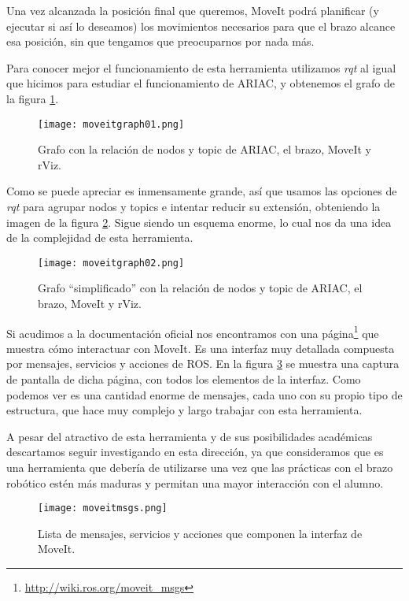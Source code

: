 Una vez alcanzada la posición final que queremos, MoveIt podrá planificar (y ejecutar si así lo deseamos) los movimientos necesarios para que el brazo alcance esa posición, sin que tengamos que preocuparnos por nada más.

Para conocer mejor el funcionamiento de esta herramienta utilizamos \textit{rqt} al igual que hicimos para estudiar el funcionamiento de ARIAC, y obtenemos el grafo de la figura \ref{fig:moveitgraph1}.

\begin{figure}[h]
	\centering
	\texttt{[image: moveitgraph01.png]}
	\caption{Grafo con la relación de nodos y topic de ARIAC, el brazo, MoveIt y rViz.} \label{fig:moveitgraph1}
\end{figure}

Como se puede apreciar es inmensamente grande, así que usamos las opciones de \textit{rqt} para agrupar nodos y topics e intentar reducir su extensión, obteniendo la imagen de la figura \ref{fig:moveitgraph2}. Sigue siendo un esquema enorme, lo cual nos da una idea de la complejidad de esta herramienta.

\begin{figure}[h]
	\centering
	\texttt{[image: moveitgraph02.png]}
	\caption{Grafo “simplificado” con la relación de nodos y topic de ARIAC, el brazo, MoveIt y rViz.} \label{fig:moveitgraph2}
\end{figure}

Si acudimos a la documentación oficial nos encontramos con una página\footnote{\url{http://wiki.ros.org/moveit_msgs}} que muestra cómo interactuar con MoveIt. Es una interfaz muy detallada compuesta por mensajes, servicios y acciones de ROS. En la figura \ref{fig:moveitmsgs} se muestra una captura de pantalla de dicha página, con todos los elementos de la interfaz. Como podemos ver es una cantidad enorme de mensajes, cada uno con su propio tipo de estructura, que hace muy complejo y largo trabajar con esta herramienta.

A pesar del atractivo de esta herramienta y de sus posibilidades académicas descartamos seguir investigando en esta dirección, ya que consideramos que es una herramienta que debería de utilizarse una vez que las prácticas con el brazo robótico estén más maduras y permitan una mayor interacción con el alumno.

\begin{figure}[h]
	\centering
	\texttt{[image: moveitmsgs.png]}
	\caption{Lista de mensajes, servicios y acciones que componen la interfaz de MoveIt.} \label{fig:moveitmsgs}
\end{figure}






